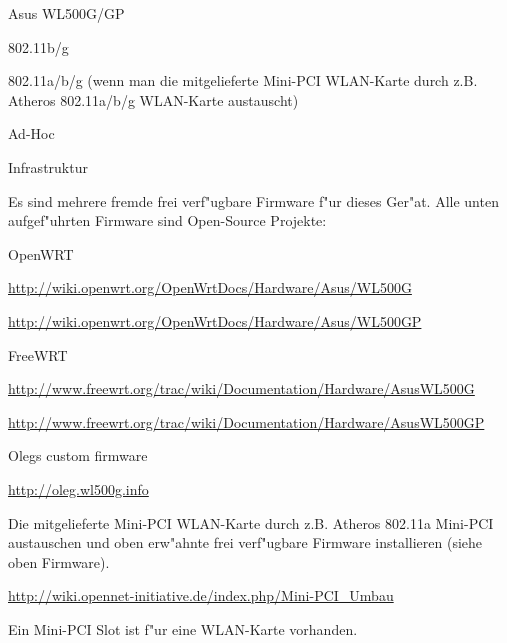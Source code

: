 %
%
\begin{wlandevice}{Asus WL500G/GP}


\begin{wlanieeestandard}
\item 802.11b/g
\item 802.11a/b/g (wenn man die mitgelieferte Mini-PCI WLAN-Karte
durch z.B. Atheros 802.11a/b/g WLAN-Karte austauscht)
\end{wlanieeestandard}

\begin{wlanmode}
\item Ad-Hoc
\item Infrastruktur
\end{wlanmode}

\begin{wlanfirmware}
\item
Es sind mehrere fremde frei verf"ugbare Firmware f"ur dieses Ger"at.
Alle unten aufgef"uhrten Firmware sind Open-Source Projekte:

OpenWRT

\url{http://wiki.openwrt.org/OpenWrtDocs/Hardware/Asus/WL500G}

\url{http://wiki.openwrt.org/OpenWrtDocs/Hardware/Asus/WL500GP}

FreeWRT

\url{http://www.freewrt.org/trac/wiki/Documentation/Hardware/AsusWL500G}

\url{http://www.freewrt.org/trac/wiki/Documentation/Hardware/AsusWL500GP}

Olegs custom firmware

\url{http://oleg.wl500g.info}
\end{wlanfirmware}


\begin{wlaninstall}
\item
Die mitgelieferte Mini-PCI WLAN-Karte durch z.B. Atheros 802.11a Mini-PCI
austauschen und oben erw"ahnte frei verf"ugbare Firmware installieren
(siehe oben Firmware).

\url{http://wiki.opennet-initiative.de/index.php/Mini-PCI_Umbau}
\end{wlaninstall}

\begin{wlanextrainfo}
\item
Ein Mini-PCI Slot ist f"ur eine WLAN-Karte vorhanden.
\end{wlanextrainfo}


\end{wlandevice}

